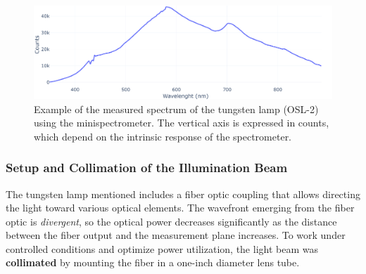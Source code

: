 \begin{figure}[h!]
    \centering
    \includegraphics[width=1\textwidth]{Figures/C3/tunsteno.png}
    \caption{Example of the measured spectrum of the tungsten lamp (OSL-2) using the minispectrometer. The vertical axis is expressed in counts, which depend on the intrinsic response of the spectrometer.}
    \label{fig:lampara_tungsteno_espectro}
\end{figure}

\subsubsection{Setup and Collimation of the Illumination Beam}
\label{subsub:montaje_colimacion}

The tungsten lamp mentioned includes a fiber optic coupling that allows directing the light toward various optical elements. The wavefront emerging from the fiber optic is \emph{divergent}, so the optical power decreases significantly as the distance between the fiber output and the measurement plane increases. To work under controlled conditions and optimize power utilization, the light beam was \textbf{collimated} by mounting the fiber in a one-inch diameter lens tube.

